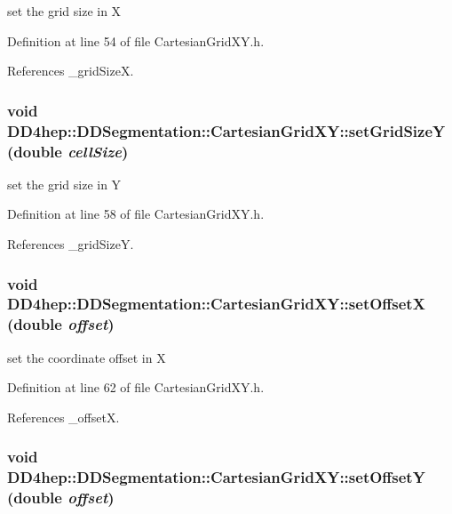 set the grid size in X 

Definition at line 54 of file CartesianGridXY.h.

References \_\-gridSizeX.\hypertarget{class_d_d4hep_1_1_d_d_segmentation_1_1_cartesian_grid_x_y_ab824e8c12fa4314119994f7f54e134cf}{
\subsubsection[{setGridSizeY}]{\setlength{\rightskip}{0pt plus 5cm}void DD4hep::DDSegmentation::CartesianGridXY::setGridSizeY (double {\em cellSize})}}
\label{class_d_d4hep_1_1_d_d_segmentation_1_1_cartesian_grid_x_y_ab824e8c12fa4314119994f7f54e134cf}


set the grid size in Y 

Definition at line 58 of file CartesianGridXY.h.

References \_\-gridSizeY.\hypertarget{class_d_d4hep_1_1_d_d_segmentation_1_1_cartesian_grid_x_y_acc939312a216a3182eba69a024049663}{
\subsubsection[{setOffsetX}]{\setlength{\rightskip}{0pt plus 5cm}void DD4hep::DDSegmentation::CartesianGridXY::setOffsetX (double {\em offset})}}
\label{class_d_d4hep_1_1_d_d_segmentation_1_1_cartesian_grid_x_y_acc939312a216a3182eba69a024049663}


set the coordinate offset in X 

Definition at line 62 of file CartesianGridXY.h.

References \_\-offsetX.\hypertarget{class_d_d4hep_1_1_d_d_segmentation_1_1_cartesian_grid_x_y_a0ce3cf2155283c1b45906709b37b07fc}{
\subsubsection[{setOffsetY}]{\setlength{\rightskip}{0pt plus 5cm}void DD4hep::DDSegmentation::CartesianGridXY::setOffsetY (double {\em offset})}}
\label{class_d_d4hep_1_1_d_d_segmentation_1_1_cartesian_grid_x_y_a0ce3cf2155283c1b45906709b37b07fc}


